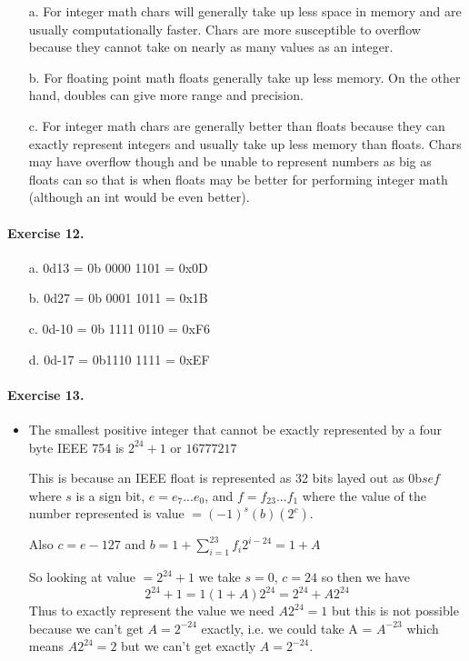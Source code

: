 \documentclass[12pt]{article}
\begin{document}
\begin{itemize}
    \item [a.]
    For integer math chars will generally take up less space in memory and are usually computationally faster.
    Chars are more susceptible to overflow because they cannot take on nearly as many values as an integer.

    \item [b.]
    For floating point math floats generally take up less memory.
    On the other hand, doubles can give more range and precision.

    \item [c.]
    For integer math chars are generally better than floats because they can exactly represent integers and usually take up less memory than floats.
    Chars may have overflow though and be unable to represent numbers as big as floats can so that is when floats may be better for performing integer math (although an int would be even better).
\end{itemize}

\paragraph{Exercise 12.}

\begin{itemize}
    \item [a.]
    0d13 = 0b 0000 1101 = 0x0D

    \item [b.]
    0d27 = 0b 0001 1011 = 0x1B

    \item [c.]
    0d-10 = 0b 1111 0110 = 0xF6

    \item [d.]
    0d-17 = 0b1110 1111 = 0xEF
\end{itemize}

\paragraph{Exercise 13.}

\begin{itemize}
    \item 
    The smallest positive integer that cannot be exactly represented by a four byte IEEE 754 is $2^{24} + 1$ or $16777217$ 
    
    This is because an IEEE float is represented as 32 bits layed out as 0b$sef$ where $s$ is a sign bit, $e = e_7...e_0$, and $f = f_{23}...f_1$ where the value of the number represented is value $= (-1)^s (b) (2^c)$.

    Also $c = e-127$ and $b = 1 + \sum_{i=1}^{23}{f_i 2^{i-24}} = 1 + A$

    So looking at value $= 2^{24} + 1$ we take $s = 0$, $c = 24$ so then we have 
    \[
        2^{24} + 1 = 1 (1+A) 2^{24} = 2^{24} + A 2^{24}
    \]
    Thus to exactly represent the value we need $A 2^{24} = 1$ but this is not possible because we can't get $A = 2^{-24}$ exactly, i.e. we could take A = $A^{-23}$ which means $A 2^{24} = 2$ but we can't get exactly $A = 2^{-24}$.

\end{itemize}
\end{document}
